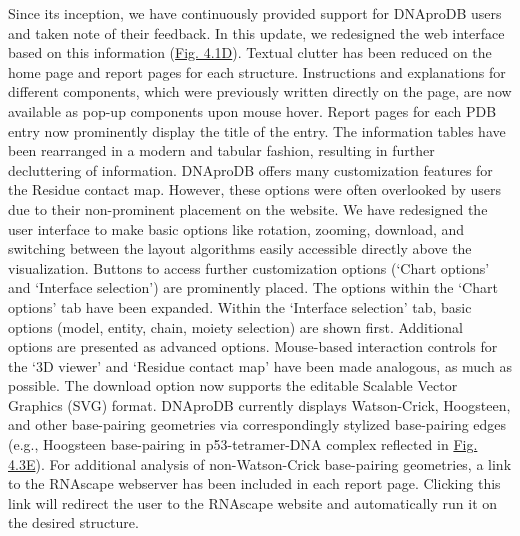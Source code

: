 Since its inception, we have continuously provided support for DNAproDB users and taken note of their feedback. In this update, we redesigned the web interface based on this information (\hyperref[fig:dnaprodb1]{Fig. 4.1D}). Textual clutter has been reduced on the home page and report pages for each structure. Instructions and explanations for different components, which were previously written directly on the page, are now available as pop-up components upon mouse hover. Report pages for each PDB entry now prominently display the title of the entry. The information tables have been rearranged in a modern and tabular fashion, resulting in further decluttering of information. 
DNAproDB offers many customization features for the Residue contact map. However, these options were often overlooked by users due to their non-prominent placement on the website. We have redesigned the user interface to make basic options like rotation, zooming, download, and switching between the layout algorithms easily accessible directly above the visualization. Buttons to access further customization options (‘Chart options’ and ‘Interface selection’) are prominently placed. The options within the ‘Chart options’ tab have been expanded. Within the ‘Interface selection’ tab, basic options (model, entity, chain, moiety selection) are shown first. Additional options are presented as advanced options. Mouse-based interaction controls for the ‘3D viewer’ and ‘Residue contact map’ have been made analogous, as much as possible.
The download option now supports the editable Scalable Vector Graphics (SVG) format. DNAproDB currently displays Watson-Crick, Hoogsteen, and other base-pairing geometries via correspondingly stylized base-pairing edges (e.g., Hoogsteen base-pairing in p53-tetramer-DNA complex \citep{Kitayner2010} reflected in \hyperref[fig:dnaprodb3]{Fig. 4.3E}). For additional analysis of non-Watson-Crick base-pairing geometries, a link to the RNAscape \citep{Mitra2024rnascape} webserver has been included in each report page. Clicking this link will redirect the user to the RNAscape website and automatically run it on the desired structure.

